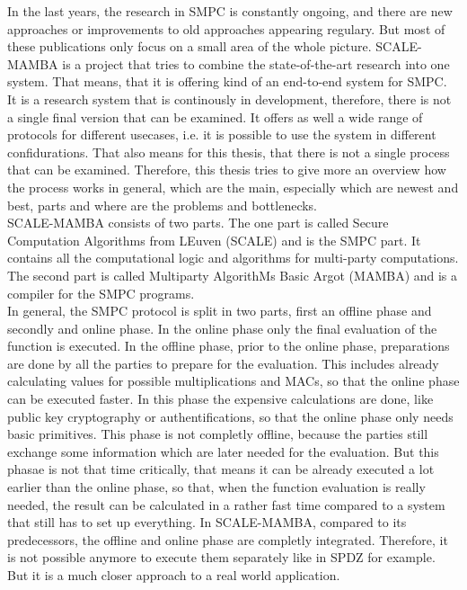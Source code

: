 \documentclass[english,runningheads,a4paper]{llncs}[2018/03/10]
\begin{document}
In the last years, the research in SMPC is constantly ongoing, and there are new approaches or improvements to old approaches appearing regulary. But most of these publications only focus on a small area of the whole picture. SCALE-MAMBA\cite{ScaleMambaDocu} is a project that tries to combine the state-of-the-art research into one system. That means, that it is offering kind of an end-to-end system for SMPC.
It is a research system that is continously in development, therefore, there is not a single final version that can be examined. It offers as well a wide range of protocols for different usecases, i.e. it is possible to use the system in different confidurations. That also means for this thesis, that there is not a single process that can be examined. Therefore, this thesis tries to give more an overview how the process works in general, which are the main, especially which are newest and best, parts and where are the problems and bottlenecks.\\
SCALE-MAMBA consists of two parts. The one part is called Secure Computation Algorithms from LEuven (SCALE) and is the SMPC part. It contains all the computational logic and algorithms for multi-party computations. The second part is called Multiparty AlgorithMs Basic Argot (MAMBA) and is a compiler for the SMPC programs.\\
 
In general, the SMPC protocol is split in two parts, first an offline phase and secondly and online phase. In the online phase only the final evaluation of the function is executed. In the offline phase, prior to the online phase, preparations are done by all the parties to prepare for the evaluation. This includes already calculating values for possible multiplications and MACs, so that the online phase can be executed faster. In this phase the expensive calculations are done, like public key cryptography or authentifications, so that the online phase only needs basic primitives. This phase is not completly offline, because the parties still exchange some information which are later needed for the evaluation. But this phasae is not that time critically, that means it can be already executed a lot earlier than the online phase, so that, when the function evaluation is really needed, the result can be calculated in a rather fast time compared to a system that still has to set up everything. In SCALE-MAMBA, compared to its predecessors, the offline and online phase are completly integrated. Therefore, it is not possible anymore to execute them separately like in SPDZ for example. But it is a much closer approach to a real world application.\\
\end{document}
